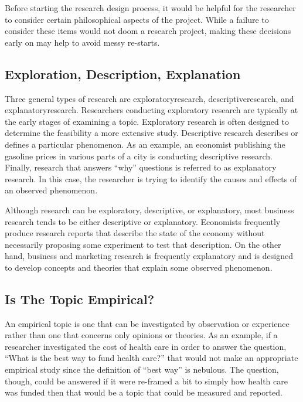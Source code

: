 Before starting the research design process, it would be helpful for the researcher to consider certain philosophical aspects of the project. While a failure to consider these items would not doom a research project, making these decisions early on may help to avoid messy re-starts. 

\subsection{Exploration, Description, Explanation}

Three general types of research are \gls{exploratoryresearch}, \gls{descriptiveresearch}, and \gls{explanatoryresearch}. Researchers conducting exploratory research are typically at the early stages of examining a topic. Exploratory research is often designed to determine the feasibility a more extensive study. Descriptive research describes or defines a particular phenomenon. As an example, an economist publishing the gasoline prices in various parts of a city is conducting descriptive research. Finally, research that answers ``why'' questions is referred to as explanatory research. In this case, the researcher is trying to identify the causes and effects of an observed phenomenon.

Although research can be exploratory, descriptive, or explanatory, most business research tends to be either descriptive or explanatory. Economists frequently produce research reports that describe the state of the economy without necessarily proposing some experiment to test that description. On the other hand, business and marketing research is frequently explanatory and is designed to develop concepts and theories that explain some observed phenomenon.

\subsection{Is The Topic Empirical?}

An empirical topic is one that can be investigated by observation or experience rather than one that concerns only opinions or theories. As an example, if a researcher investigated the cost of health care in order to answer the question, ``What is the best way to fund health care?'' that would not make an appropriate empirical study since the definition of ``best way'' is nebulous. The question, though, could be answered if it were re-framed a bit to simply how health care was funded then that would be a topic that could be measured and reported.

